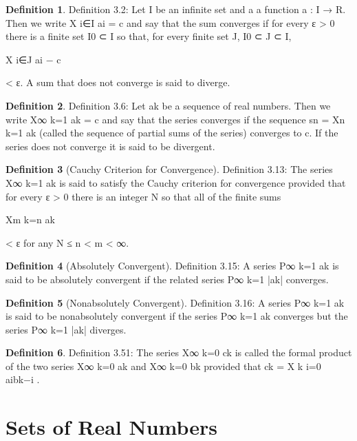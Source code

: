 \documentclass[11pt]{article}
\theoremstyle{definition}
\newtheorem{definition}{Definition}[section]
\begin{document}
\setcounter{definition}{1}
\begin{definition}
	Definition 3.2: Let I be an infinite set and a a function a : I → R. Then we write
	X
	i∈I
	ai = c
	and say that the sum converges if for every ε > 0 there is a finite set I0 ⊂ I so that, for every finite set J,
	I0 ⊂ J ⊂ I,
	
	X
	i∈J
	ai − c
	
	< ε.
	A sum that does not converge is said to diverge.
\end{definition}

\setcounter{definition}{5}
\begin{definition}
	Definition 3.6: Let {ak} be a sequence of real numbers. Then we write
	X∞
	k=1
	ak = c
	and say that the series converges if the sequence
	sn =
	Xn
	k=1
	ak
	(called the sequence of partial sums of the series) converges to c. If the series does not converge it is said
	to be divergent.
\end{definition}

\setcounter{definition}{12}
\begin{definition} [Cauchy Criterion for Convergence]
	Definition 3.13: The series
	X∞
	k=1
	ak
	is said to satisfy the Cauchy criterion for convergence provided that for every ε > 0 there is an integer N
	so that all of the finite sums
	
	Xm
	k=n
	ak
	
	< ε
	for any N ≤ n < m < ∞.
\end{definition}

\setcounter{definition}{14}
\begin{definition} [Absolutely Convergent]
	Definition 3.15: A series P∞
	k=1 ak is said to be absolutely convergent if the related series P∞
	k=1 |ak| converges.
\end{definition}


\begin{definition} [Nonabsolutely Convergent]
	Definition 3.16: A series P∞
	k=1 ak is said to be nonabsolutely convergent if the series P∞
	k=1 ak converges
	but the series P∞
	k=1 |ak| diverges.
\end{definition}

\setcounter{definition}{50}
\begin{definition}
	Definition 3.51: The series
	X∞
	k=0
	ck
	is called the formal product of the two series
	X∞
	k=0
	ak and X∞
	k=0
	bk
	provided that
	ck =
	X
	k
	i=0
	aibk−i
	.
\end{definition}

\section{Sets of Real Numbers}
\end{document}

